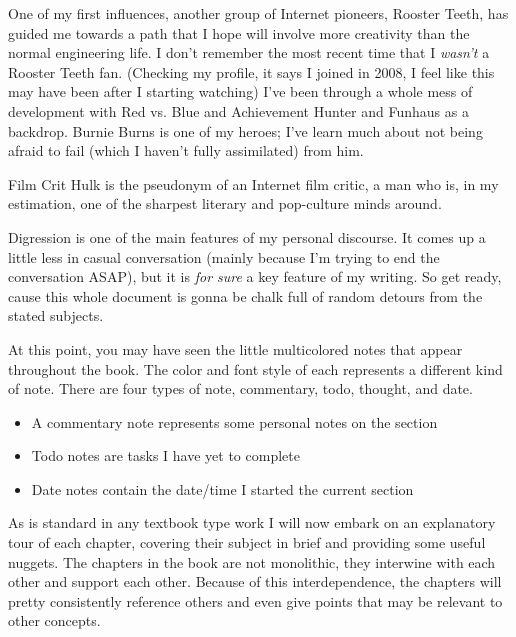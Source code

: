 \documentclass[./butidigress.tex]{subfiles}
\begin{document}
One of my first influences, another group of Internet pioneers, Rooster Teeth, has guided me towards a path that I hope will involve more creativity than the normal engineering life.
I don't remember the most recent time that I \emph{wasn't} a Rooster Teeth fan.
(Checking my profile, it says I joined in 2008, I feel like this may have been after I starting watching)
I've been through a whole mess of development with Red vs. Blue and Achievement Hunter and Funhaus as a backdrop.
Burnie Burns is one of my heroes; I've learn much about not being afraid to fail (which I haven't fully assimilated) from him.

Film Crit Hulk is the pseudonym of an Internet film critic, a man who is, in my estimation, one of the sharpest literary and pop-culture minds around.

\label{sec:thetitle}
Digression is one of the main features of my personal discourse.
It comes up a little less in casual conversation (mainly because I'm trying to end the conversation ASAP), but it is \emph{for sure} a key feature of my writing.
So get ready, cause this whole document is gonna be chalk full of random detours from the stated subjects.

At this point, you may have seen the little multicolored notes that appear throughout the book.
The color and font style of each represents a different kind of note.
There are four types of note, commentary, todo, thought, and date.

\begin{itemize}
    \item {\commstyle\textcolor{\commcolor}{A commentary note represents some personal notes on the section}}
    \item {\todostyle\textcolor{\todocolor}{Todo notes are tasks I have yet to complete}}
    \item {\textcolor{\datecolor}{Date notes contain the date/time I started the current section}}
\end{itemize}

\label{sec:chapterrundown}
As is standard in any textbook type work I will now embark on an explanatory tour of each chapter, covering their subject in brief and providing some useful nuggets.
The chapters in the book are not monolithic, they interwine with each other and support each other.
Because of this interdependence, the chapters will pretty consistently reference others and even give points that may be relevant to other concepts.
\end{document}
